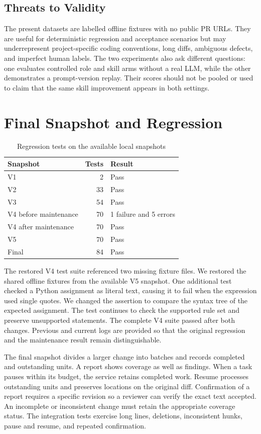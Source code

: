 \documentclass[journal,compsoc]{IEEEtran}
\begin{document}
\subsection{Threats to Validity}
The present datasets are labelled offline fixtures with no public PR URLs. They are useful for deterministic regression and acceptance scenarios but may underrepresent project-specific coding conventions, long diffs, ambiguous defects, and imperfect human labels. The two experiments also ask different questions: one evaluates controlled role and skill arms without a real LLM, while the other demonstrates a prompt-version replay. Their scores should not be pooled or used to claim that the same skill improvement appears in both settings.

\section{Final Snapshot and Regression}
\begin{table}[h]
\caption{Regression tests on the available local snapshots}
\centering
\begin{tabular}{lrl}
\toprule
Snapshot & Tests & Result \\ \midrule
V1 & 2 & Pass \\
V2 & 33 & Pass \\
V3 & 54 & Pass \\
V4 before maintenance & 70 & 1 failure and 5 errors \\
V4 after maintenance & 70 & Pass \\
V5 & 70 & Pass \\
Final & 84 & Pass \\ \bottomrule
\end{tabular}
\end{table}
The restored V4 test suite referenced two missing fixture files. We restored the shared offline fixtures from the available V5 snapshot. One additional test checked a Python assignment as literal text, causing it to fail when the expression used single quotes. We changed the assertion to compare the syntax tree of the expected assignment. The test continues to check the supported rule set and preserve unsupported statements. The complete V4 suite passed after both changes. Previous and current logs are provided so that the original regression and the maintenance result remain distinguishable.

The final snapshot divides a larger change into batches and records completed and outstanding units. A report shows coverage as well as findings. When a task pauses within its budget, the service retains completed work. Resume processes outstanding units and preserves locations on the original diff. Confirmation of a report requires a specific revision so a reviewer can verify the exact text accepted. An incomplete or inconsistent change must retain the appropriate coverage status. The integration tests exercise long lines, deletions, inconsistent hunks, pause and resume, and repeated confirmation.
\end{document}
